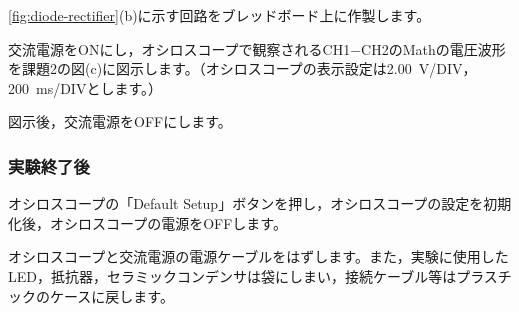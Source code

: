 \begin{procedure}[leftmargin=*, labelsep=0.8em]
  \item \cref{fig:diode-rectifier}(b)に示す回路をブレッドボード上に作製します。
  \item 交流電源をONにし，オシロスコープで観察されるCH1$-$CH2のMathの電圧波形を課題2の図(c)に図示します。（オシロスコープの表示設定は\SI{2.00}{V}/DIV，\SI{200}{ms}/DIVとします。）
  \item 図示後，交流電源をOFFにします。
\end{procedure}

\subsubsection{実験終了後}

\begin{procedure}[leftmargin=*, labelsep=0.8em]
  \item オシロスコープの「Default Setup」ボタンを押し，オシロスコープの設定を初期化後，オシロスコープの電源をOFFします。
  \item オシロスコープと交流電源の電源ケーブルをはずします。また，実験に使用したLED，抵抗器，セラミックコンデンサは袋にしまい，接続ケーブル等はプラスチックのケースに戻します。
\end{procedure}
